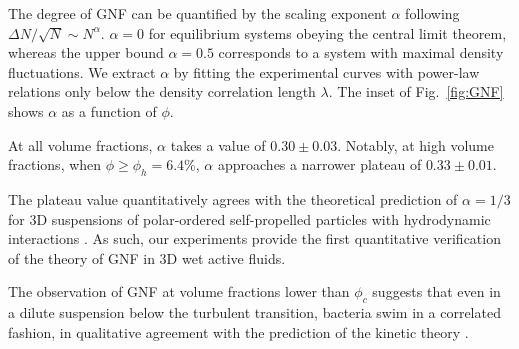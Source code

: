 The degree of GNF can be quantified by the scaling exponent $\alpha$ following $\Delta N/\sqrt{N} \sim N^\alpha$. $\alpha=0$ for equilibrium systems obeying the central limit theorem, whereas the upper bound $\alpha = 0.5$ corresponds to a system with maximal density fluctuations.
We extract $\alpha$ by fitting the experimental curves with power-law relations only below the density correlation length $\lambda$. The inset of Fig.~\ref{fig:GNF} shows $\alpha$ as a function of $\phi$.

At all volume fractions, $\alpha$ takes a value of $0.30 \pm 0.03$. Notably, at high volume fractions, when $\phi \geq \phi_h = 6.4\%$, $\alpha$ approaches a narrower plateau of $0.33 \pm 0.01$.

The plateau value quantitatively agrees with the theoretical prediction of $\alpha = 1/3$ for 3D suspensions of polar-ordered self-propelled particles with hydrodynamic interactions \cite{Simha2002}. As such, our experiments provide the first quantitative verification of the theory of GNF in 3D wet active fluids.

The observation of GNF at volume fractions lower than $\phi_c$ suggests that even in a dilute suspension below the turbulent transition, bacteria swim in a correlated fashion, in qualitative agreement with the prediction of the kinetic theory \cite{Stenhammar2017}.


